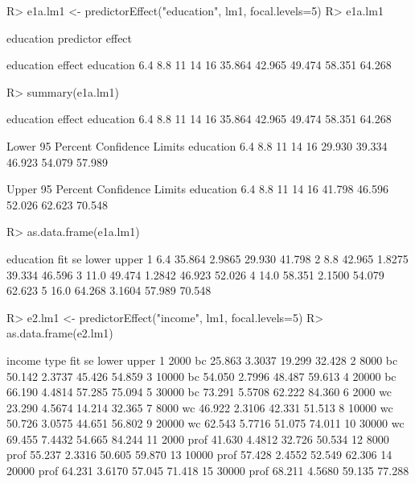 \documentclass[
]{article}
\begin{document}
\begin{Schunk}
\begin{Sinput}
R> e1a.lm1 <- predictorEffect("education", lm1, focal.levels=5)
R> e1a.lm1
\end{Sinput}
\begin{Soutput}

 education predictor effect

 education effect
education
   6.4    8.8     11     14     16 
35.864 42.965 49.474 58.351 64.268 
\end{Soutput}
\begin{Sinput}
R> summary(e1a.lm1)
\end{Sinput}
\begin{Soutput}

 education effect
education
   6.4    8.8     11     14     16 
35.864 42.965 49.474 58.351 64.268 

 Lower 95 Percent Confidence Limits
education
   6.4    8.8     11     14     16 
29.930 39.334 46.923 54.079 57.989 

 Upper 95 Percent Confidence Limits
education
   6.4    8.8     11     14     16 
41.798 46.596 52.026 62.623 70.548 
\end{Soutput}
\begin{Sinput}
R> as.data.frame(e1a.lm1)
\end{Sinput}
\begin{Soutput}
  education    fit     se  lower  upper
1       6.4 35.864 2.9865 29.930 41.798
2       8.8 42.965 1.8275 39.334 46.596
3      11.0 49.474 1.2842 46.923 52.026
4      14.0 58.351 2.1500 54.079 62.623
5      16.0 64.268 3.1604 57.989 70.548
\end{Soutput}
\end{Schunk}
\begin{Schunk}
\begin{Sinput}
R> e2.lm1 <- predictorEffect("income", lm1, focal.levels=5)
R> as.data.frame(e2.lm1)
\end{Sinput}
\begin{Soutput}
   income type    fit     se  lower  upper
1    2000   bc 25.863 3.3037 19.299 32.428
2    8000   bc 50.142 2.3737 45.426 54.859
3   10000   bc 54.050 2.7996 48.487 59.613
4   20000   bc 66.190 4.4814 57.285 75.094
5   30000   bc 73.291 5.5708 62.222 84.360
6    2000   wc 23.290 4.5674 14.214 32.365
7    8000   wc 46.922 2.3106 42.331 51.513
8   10000   wc 50.726 3.0575 44.651 56.802
9   20000   wc 62.543 5.7716 51.075 74.011
10  30000   wc 69.455 7.4432 54.665 84.244
11   2000 prof 41.630 4.4812 32.726 50.534
12   8000 prof 55.237 2.3316 50.605 59.870
13  10000 prof 57.428 2.4552 52.549 62.306
14  20000 prof 64.231 3.6170 57.045 71.418
15  30000 prof 68.211 4.5680 59.135 77.288
\end{Soutput}
\end{Schunk}
\end{document}
